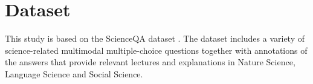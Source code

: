 \documentclass{article}
\begin{document}

\section{Dataset}
\label{dataset}
This study is based on the ScienceQA dataset \cite{lu2022learn}. The dataset includes a variety of science-related multimodal multiple-choice questions together with annotations of the answers that provide relevant lectures and explanations in Nature Science, Language Science and Social Science.
\end{document}

